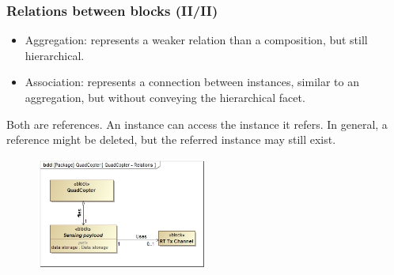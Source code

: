 \documentclass[xcolor=dvipsnames,t]{beamer}
\begin{document}
\begin{frame}
\frametitle{Relations between blocks (II/II)}


\begin{itemize}
\item Aggregation: represents a weaker relation than a composition, but still hierarchical.
\item Association: represents a connection between instances, similar to an aggregation, but without conveying the hierarchical facet.
\end{itemize}

Both are references. An instance can access the instance it refers. In general, a reference might be deleted, but the referred instance may still exist. %



\begin{figure}
 	\includegraphics[width=0.5\textwidth]{QuadRelations.jpg}
\end{figure}

\end{frame}
\end{document}
